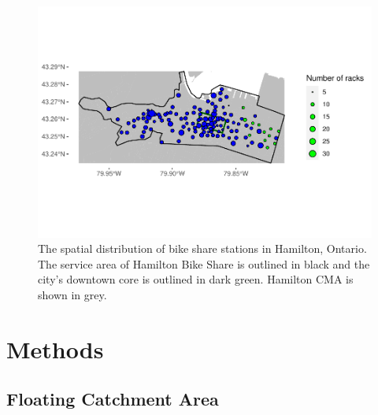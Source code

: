 \documentclass[]{elsarticle} %
\begin{document}
\begin{figure}

{\centering \includegraphics[width=1\linewidth]{Bike-share-spatial-equity_files/figure-latex/sobi-stations-in-hamilton-1} 

}

\caption{The spatial distribution of bike share stations in Hamilton, Ontario. The service area of Hamilton Bike Share is outlined in black and the city's downtown core is outlined in dark green. Hamilton CMA is shown in grey.}\label{fig:sobi-stations-in-hamilton}
\end{figure}

\hypertarget{sec:methods}{%
\section{Methods}\label{sec:methods}}

\hypertarget{floating-catchment-area}{%
\subsection{Floating Catchment Area}\label{floating-catchment-area}}
\end{document}

